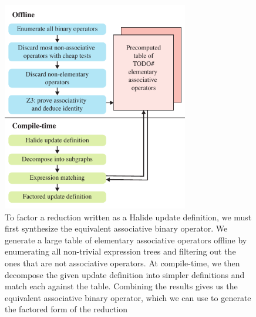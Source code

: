\begin{figure}
\centering
\includegraphics[width=3.2in]{system}
\caption{To factor a reduction written as a Halide update definition, we must first synthesize the equivalent associative binary operator. We generate a large table of elementary associative operators offline by enumerating all non-trivial expression trees and filtering out the ones that are not associative operators. At compile-time, we then decompose the given update definition into simpler definitions and match each against the table. Combining the results gives us the equivalent associative binary operator, which we can use to generate the factored form of the reduction}
\label{fig:system}
\end{figure}
